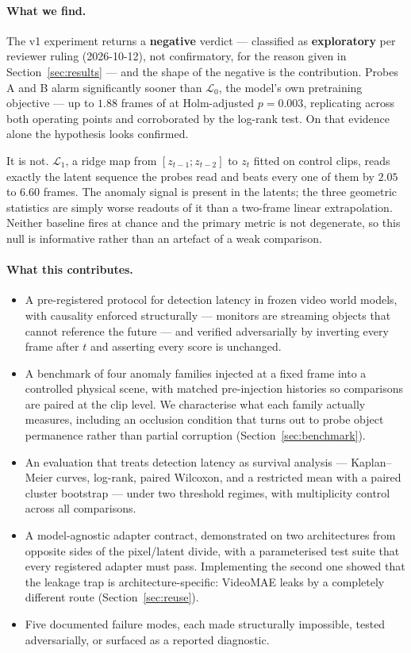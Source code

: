 \paragraph{What we find.}
The v1 experiment returns a \textbf{negative} verdict --- classified as
\textbf{exploratory} per reviewer ruling (2026-10-12), not confirmatory, for
the reason given in Section~\ref{sec:results} --- and the shape of
the negative is the contribution. Probes A and B alarm significantly sooner than
$\mathcal{L}_0$, the model's own pretraining objective --- up to $1.88$ frames
of \RMTA{} at Holm-adjusted $p = 0.003$, replicating across both operating
points and corroborated by the log-rank test. On that evidence alone the
hypothesis looks confirmed.

It is not. $\mathcal{L}_1$, a ridge map from $[z_{t-1}; z_{t-2}]$ to $z_t$
fitted on control clips, reads exactly the latent sequence the probes read and
beats every one of them by $2.05$ to $6.60$ frames. The anomaly signal is
present in the latents; the three geometric statistics are simply worse
readouts of it than a two-frame linear extrapolation. Neither baseline fires at
chance and the primary metric is not degenerate, so this null is informative
rather than an artefact of a weak comparison.

\paragraph{What this contributes.}
\begin{itemize}
\item A pre-registered protocol for detection latency in frozen video world
models, with causality enforced structurally --- monitors are streaming objects
that cannot reference the future --- and verified adversarially by inverting
every frame after $t$ and asserting every score is unchanged.
\item A benchmark of four anomaly families injected at a fixed frame into a
controlled physical scene, with matched pre-injection histories so comparisons
are paired at the clip level. We characterise what each family actually
measures, including an occlusion condition that turns out to probe object
permanence rather than partial corruption (Section~\ref{sec:benchmark}).
\item An evaluation that treats detection latency as survival analysis ---
Kaplan--Meier curves, log-rank, paired Wilcoxon, and a restricted mean with a
paired cluster bootstrap --- under two threshold regimes, with multiplicity
control across all comparisons.
\item A model-agnostic adapter contract, demonstrated on two architectures from
opposite sides of the pixel/latent divide, with a parameterised test suite that
every registered adapter must pass. Implementing the second one showed that the
leakage trap is architecture-specific: VideoMAE leaks by a completely different
route (Section~\ref{sec:reuse}).
\item Five documented failure modes, each made structurally impossible, tested
adversarially, or surfaced as a reported diagnostic.
\end{itemize}

